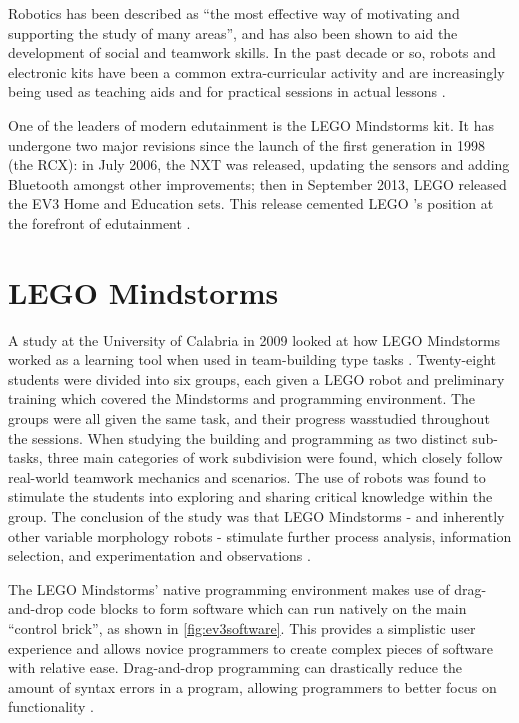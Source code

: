 \documentclass{report}
\newcommand{\lego}{LEGO }
\begin{document}
    Robotics has been described as \enquote{the most effective way of motivating and supporting the study of many areas}, and has also been shown to aid the development of social and teamwork skills. In the past decade or so, robots and electronic kits have been a common extra-curricular activity and are increasingly being used as teaching aids and for practical sessions in actual lessons \cite{Johnson2003}.
    
	One of the leaders of modern edutainment is the \lego Mindstorms kit. It has undergone two major revisions since the launch of the first generation in 1998 (the RCX): in July 2006, the NXT was released, updating the sensors and adding Bluetooth amongst other improvements; then in September 2013, \lego released the EV3 Home and Education sets. This release cemented \lego's position at the forefront of edutainment \cite{Becker}.
    
    \section{\lego Mindstorms}
    A study at the University of Calabria in 2009 looked at how \lego Mindstorms worked as a learning tool when used in team-building type tasks \cite{Bilotta2009}. Twenty-eight students were divided into six groups, each given a \lego robot and preliminary training which covered the Mindstorms and programming environment. The groups were all given the same task, and their progress wasstudied throughout the sessions. When studying the building and programming as two distinct sub-tasks, three main categories of work subdivision were found, which closely follow real-world teamwork mechanics and scenarios. The use of robots was found to stimulate the students into exploring and sharing critical knowledge within the group. The conclusion of the study was that \lego Mindstorms - and inherently other variable morphology robots - stimulate further process analysis, information selection, and experimentation and observations \cite{Bilotta2009}.
    
    The \lego Mindstorms' native programming environment makes use of drag-and-drop code blocks to form software which can run natively on the main \enquote{control brick}, as shown in \ref{fig:ev3software}. This provides a simplistic user experience and allows novice programmers to create complex pieces of software with relative ease. Drag-and-drop programming can drastically reduce the amount of syntax errors in a program, allowing programmers to better focus on functionality \cite{Kelleher2002}.
\end{document}
